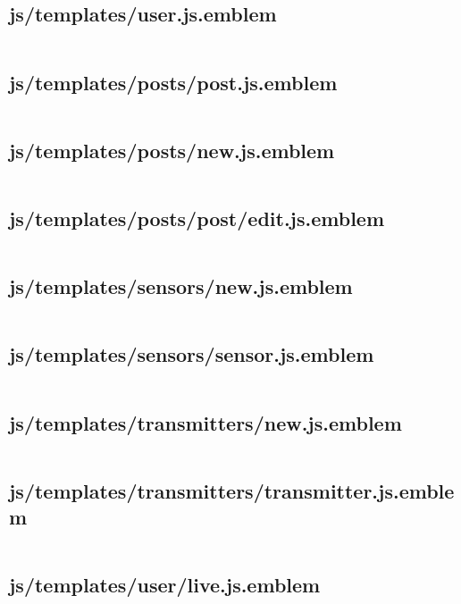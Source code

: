 \documentclass[letterpaper, 12 pt]{article}
\begin{document}
\subsection{js/templates/user.js.emblem}
\inputminted{ruby}{../app/assets/javascripts/templates/user.js.emblem}

\subsection{js/templates/posts/post.js.emblem}
\inputminted{ruby}{../app/assets/javascripts/templates/posts/post.js.emblem}
\subsection{js/templates/posts/new.js.emblem}
\inputminted{ruby}{../app/assets/javascripts/templates/posts/new.js.emblem}
\subsection{js/templates/posts/post/edit.js.emblem}
\inputminted{ruby}{../app/assets/javascripts/templates/posts/post/edit.js.emblem}

\subsection{js/templates/sensors/new.js.emblem}
\inputminted{ruby}{../app/assets/javascripts/templates/sensors/new.js.emblem}
\subsection{js/templates/sensors/sensor.js.emblem}
\inputminted{ruby}{../app/assets/javascripts/templates/sensors/sensor.js.emblem}

\subsection{js/templates/transmitters/new.js.emblem}
\inputminted{ruby}{../app/assets/javascripts/templates/transmitters/new.js.emblem}
\subsection{js/templates/transmitters/transmitter.js.emblem}
\inputminted{ruby}{../app/assets/javascripts/templates/transmitters/transmitter.js.emblem}

\subsection{js/templates/user/live.js.emblem}
\inputminted{ruby}{../app/assets/javascripts/templates/user/live.js.emblem}
\end{document}
